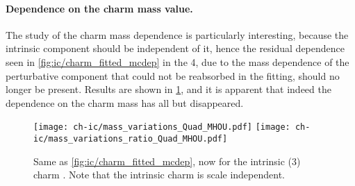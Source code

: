 \paragraph{Dependence on the charm mass value.}
%
The study of the charm mass dependence is particularly interesting,
because the intrinsic component should be independent of it, hence the
residual dependence seen in \cref{fig:ic/charm_fitted_mcdep} in the
4\fns, due to the mass dependence of the perturbative component that
could not be reabsorbed in the fitting, should no longer be present. 
Results are shown in
\cref{fig:ic/mass_variations_Quad_MHOU}, and it is apparent that
indeed the dependence on the charm mass has all but disappeared.


\begin{figure}[h]
  \begin{center}
\texttt{[image: ch-ic/mass\_variations\_Quad\_MHOU.pdf]}
    \texttt{[image: ch-ic/mass\_variations\_ratio\_Quad\_MHOU.pdf]}
\caption{\small      
 Same as \cref{fig:ic/charm_fitted_mcdep}, now for
      the intrinsic (3\fns) charm \pdf. Note that the intrinsic charm
      \pdf is scale independent.
  \label{fig:ic/mass_variations_Quad_MHOU} }
\end{center}
\end{figure}
